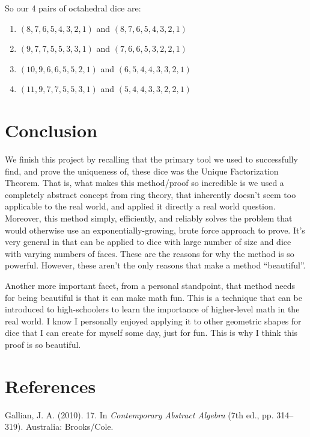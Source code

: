 \documentclass[12pt]{report}
\begin{document}
So our 4 pairs of octahedral dice are:
\begin{enumerate}
\item $(8,7,6,5,4,3,2,1)$ and $(8,7,6,5,4,3,2,1)$
\item $(9,7,7,5,5,3,3,1)$ and $(7,6,6,5,3,2,2,1)$
\item $(10,9,6,6,5,5,2,1)$ and $(6,5,4,4,3,3,2,1)$
\item $(11,9,7,7,5,5,3,1)$ and $(5,4,4,3,3,2,2,1)$
\end{enumerate}

\section*{Conclusion}
We finish this project by recalling that the primary tool we used to successfully find, and prove the
uniqueness of, these dice was the Unique Factorization Theorem. That is, what makes this method/proof so
incredible is we used a completely abstract concept from ring theory, that inherently doesn't seem too
applicable to the real world, and applied it directly a real world question. Moreover, this method simply,
efficiently, and reliably solves the problem that would otherwise use an exponentially-growing, brute force
approach to prove. It's very general in that can be applied to dice with large number of size and dice with
varying numbers of faces. These are the reasons for why the method is so powerful. However, these aren't the
only reasons that make a method ``beautiful''.

Another more important facet, from a personal standpoint, that method needs for being beautiful is that it can
make math fun. This is a technique that can be introduced to high-schoolers to learn the importance of
higher-level math in the real world. I know I personally enjoyed applying it to other geometric shapes for
dice that I can create for myself some day, just for fun. This is why I think this proof is so beautiful.

\section*{References}
Gallian, J. A. (2010). 17. In \textit{Contemporary Abstract Algebra} (7th ed., pp. 314--319). Australia: Brooks/Cole.
\end{document}
